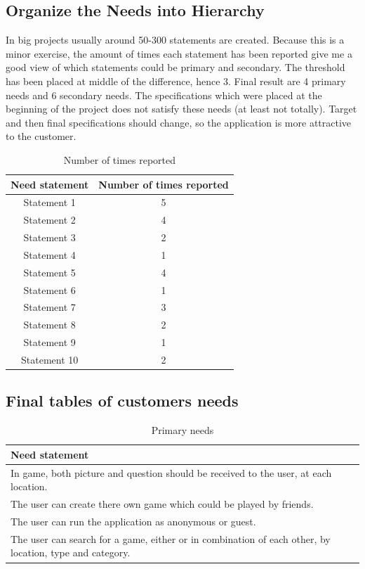 \documentclass{TDP003mall}
\begin{document}
\subsection{Organize the Needs into Hierarchy}
In big projects usually around 50-300 statements are created. Because this is a minor exercise,
the amount of times each statement has been reported give me a good view of which statements
could be primary and secondary. The threshold has been placed at middle of the difference, hence 3.
Final result are 4 primary needs and 6 secondary needs.
The specifications which were placed at the beginning of the project does not satisfy these needs
(at least not totally). Target and then final specifications should change, so the application is more
attractive to the customer.

\begin{table}[htb]
\caption{Number of times reported}
\centering
\begin{tabular}{c c}
\hline\hline
Need statement & Number of times reported \\[0.5ex]
\hline
Statement 1 & 5 \\
Statement 2 & 4 \\
Statement 3 & 2 \\
Statement 4 & 1 \\
Statement 5 & 4 \\
Statement 6 & 1 \\
Statement 7 & 3 \\
Statement 8 & 2 \\
Statement 9 & 1 \\
Statement 10 & 2 \\ [1ex]
\hline
\end{tabular}
\label{table:NumberOfTimesReported}
\end{table}

\pagebreak

\subsection{Final tables of customers needs}

\begin{table}[htb]
\caption{Primary needs}
\centering
\begin{tabular}{l}
\hline\hline
Need statement \\[0.5ex]
\hline
In game, both picture and question should be received to the user, at each location. \\
The user can create there own game which could be played by friends. \\
The user can run the application as anonymous or guest. \\
The user can search for a game, either or in combination of each other, by location, type and category. \\ [1ex]
\hline
\end{tabular}
\label{table:PrimaryNeeds}
\end{table}
\end{document}
